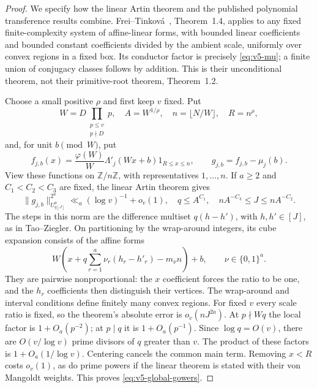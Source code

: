 \documentclass[11pt]{article}
\theoremstyle{definition}
\theoremstyle{remark}
\begin{document}
\begin{proof}
We specify how the linear Artin theorem and the published polynomial
transference results combine. Frei--Tinkov\'a~\cite{v5ft}, Theorem~1.4,
applies to any fixed finite-complexity system of affine-linear forms,
with bounded linear coefficients and bounded constant coefficients divided
by the ambient scale, uniformly over convex regions in a fixed box.
Its conductor factor is precisely \eqref{eq:v5-mu}; a finite union of
conjugacy classes follows by addition. This is their unconditional theorem,
not their primitive-root theorem, Theorem~1.2.

Choose a small positive $\rho$ and first keep $v$ fixed. Put
\[
 W=D\prod_{\substack{p\leq v\\p\nmid D}}p,\quad
 A=W^{1/\rho},\quad n=\lfloor N/W\rfloor,\quad R=n^\rho,
\]
and, for unit $b\pmod W$, put
\[
 f_{j,b}(x)=\frac{\varphi(W)}W\Lambda'_j(Wx+b)1_{R\leq x\leq n},
 \qquad g_{j,b}=f_{j,b}-\mu_j(b).
\]
View these functions on $\mathbb Z/n\mathbb Z$, with representatives
$1,\ldots,n$. If $a\geq2$ and $C_1<C_2<C_3$ are fixed, the linear Artin
theorem gives
\begin{equation}\label{eq:v5-global-gowers}
 \|g_{j,b}\|_{U^a_{q[J]}}^{2^a}
       \ll_a(\log v)^{-1}+o_v(1),
 \quad q\leq A^{C_1},\quad
 nA^{-C_3}\leq J\leq nA^{-C_2}.
\end{equation}
The steps in this norm are the difference multiset $q(h-h')$, with
$h,h'\in[J]$, as in Tao--Ziegler. On partitioning by the wrap-around
integers, its cube expansion consists of the affine forms
\[
 W\left(x+q\sum_{r=1}^a\nu_r(h_r-h'_r)-m_\nu n\right)+b,
 \qquad \nu\in\{0,1\}^a.
\]
They are pairwise nonproportional: the $x$ coefficient forces the ratio to
be one, and the $h_r$ coefficients then distinguish their vertices.
The wrap-around and interval conditions define finitely many convex
regions. For fixed $v$ every scale ratio is fixed, so the theorem's
absolute error is $o_v(nJ^{2a})$.
At $p\nmid Wq$ the local factor is $1+O_a(p^{-2})$; at $p\mid q$ it is
$1+O_a(p^{-1})$. Since $\log q=O(v)$, there are $O(v/\log v)$ prime
divisors of $q$ greater than $v$. The product of these factors is
$1+O_a(1/\log v)$. Centering cancels the common main term. Removing
$x<R$ costs $o_v(1)$, as do prime powers if the linear theorem is stated
with their von Mangoldt weights. This proves \eqref{eq:v5-global-gowers}.


\end{proof}
\end{document}
